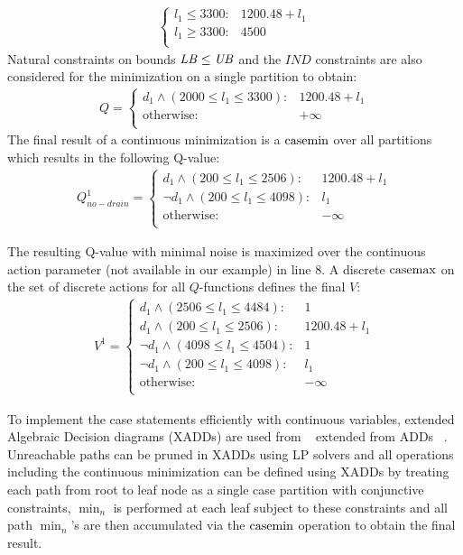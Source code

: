 \begin{itemize}
{\begin{align}
\begin{cases}
 l_1\leq  3300 :&  1200.48 + l_1 \\
  l_1\geq  3300 :&  4500 \\
\end{cases} \nonumber
\end{align}
}
Natural constraints on bounds $\mathit{LB} \leq \mathit{UB}$ and the $IND$ constraints are also considered for the minimization on a single partition to obtain: 
{\footnotesize
\begin{align}
Q =  
\begin{cases}
d_1 \land ( 2000 \leq l_1 \leq 3300 ):&  1200.48 + l_1 \\
\text{otherwise} :&  + \infty \\ 
\end{cases} \nonumber
\end{align}
}
The final result of a continuous minimization is a $\mathrm{casemin}$ over all partitions which results in the following Q-value:
{\footnotesize
\begin{align}
Q^1_{\mathit{no}-\mathit{drain}} =  
\begin{cases}
d_1 \land (200 \leq l_1 \leq 2506) : & 1200.48 + l_1 \\
\neg d_1 \land (200 \leq l_1 \leq 4098) : & l_1 \\
\text{otherwise} : & -\infty \\ 
\end{cases} \nonumber
\end{align}
}

The resulting Q-value with minimal noise is maximized over the continuous action parameter (not available in our example) in line 8. A discrete $\mathrm{casemax}$ on the set of discrete actions for all $Q$-functions defines the final $V$:
{\footnotesize
\begin{align}
V^1 =  
\begin{cases}
d_1 \land (2506 \leq l_1 \leq 4484): & 1 \\
d_1 \land (200 \leq l_1 \leq 2506): & 1200.48 + l_1 \\
\neg d_1 \land (4098 \leq l_1 \leq 4504) : & 1 \\
\neg d_1 \land (200 \leq l_1 \leq 4098) : & l_1 \\
\text{otherwise} : & -\infty \\ 
\end{cases} \nonumber
\end{align}
}
\end{itemize}

To implement the case statements efficiently with continuous variables, extended Algebraic Decision diagrams (XADDs) are used from ~\cite{sanner_uai11} extended from ADDs ~\cite{bahar93add}. Unreachable paths can be pruned in XADDs using LP solvers and all operations including the continuous minimization can be defined using XADDs by treating each path from root to leaf node as a single case partition with conjunctive constraints,  $\min_n$ is performed at each leaf subject to these constraints and all path $\min_n$'s are then accumulated via the $\mathrm{casemin}$ operation to obtain the final result.


